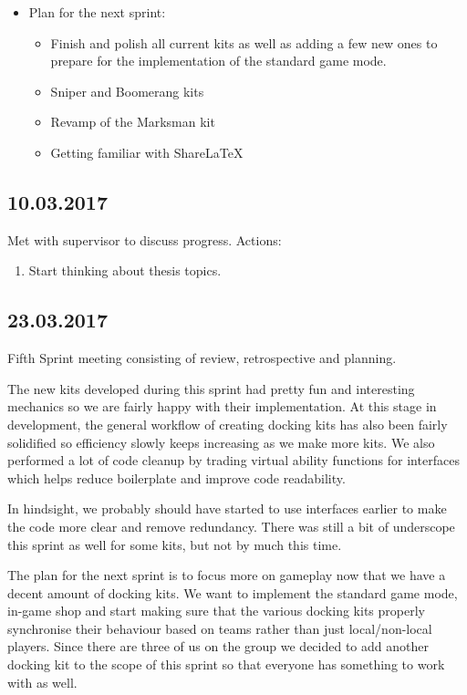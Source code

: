 \begin{itemize}
    \item Plan for the next sprint:
    \begin{itemize}
        \item Finish and polish all current kits as well as adding a few new ones to prepare for the implementation of the standard game mode.
        \item Sniper and Boomerang kits
        \item Revamp of the Marksman kit
        \item Getting familiar with ShareLaTeX
    \end{itemize}
\end{itemize}

\subsection*{10.03.2017}
Met with supervisor to discuss progress. Actions:
\begin{enumerate}
    \item Start thinking about thesis topics.
\end{enumerate}

\subsection*{23.03.2017}
Fifth Sprint meeting consisting of review, retrospective and planning.

The new kits developed during this sprint had pretty fun and interesting mechanics so we are fairly happy with their implementation. At this stage in development, the general workflow of creating docking kits has also been fairly solidified so efficiency slowly keeps increasing as we make more kits. We also performed a lot of code cleanup by trading virtual ability functions for interfaces which helps reduce boilerplate and improve code readability. 

In hindsight, we probably should have started to use interfaces earlier to make the code more clear and remove redundancy. There was still a bit of underscope this sprint as well for some kits, but not by much this time. 

The plan for the next sprint is to focus more on gameplay now that we have a decent amount of docking kits. We want to implement the standard game mode, in-game shop and start making sure that the various docking kits properly synchronise their behaviour based on teams rather than just local/non-local players. Since there are three of us on the group we decided to add another docking kit to the scope of this sprint so that everyone has something to work with as well. 

